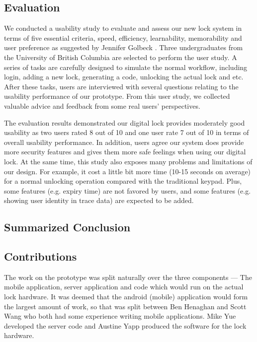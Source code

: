 \documentclass[conference]{IEEEtran}
\begin{document}
\subsection{Evaluation}
We conducted a usability study to evaluate and assess our new lock system in terms of five essential criteria, speed, efficiency, learnability, memorability and user preference as suggested by Jennifer Golbeck \cite{JG}. Three undergraduates from the University of British Columbia are selected to perform the user study. A series of tasks are carefully designed to simulate the normal workflow, including login, adding a new lock, generating a code, unlocking the actual lock and etc. After these tasks, users are interviewed with several questions relating to the usability performance of our prototype. From this user study, we collected valuable advice and feedback from some real users’ perspectives.

The evaluation results demonstrated our digital lock provides moderately good usability as two users rated 8 out of 10 and one user rate 7 out of 10 in terms of overall usability performance. In addition, users agree our system does provide more security features and gives them more safe feelings when using our digital lock. At the same time, this study also exposes many problems and limitations of our design. For example, it cost a little bit more time (10-15 seconds on average) for a normal unlocking operation compared with the traditional keypad. Plus, some features (e.g. expiry time) are not favored by users, and some features (e.g. showing user identity in trace data) are expected to be added.

\subsection{Summarized Conclusion}

\subsection{Contributions}
The work on the prototype was split naturally over the three components --- The mobile application, server application and code which would run on the actual lock hardware.
It was deemed that the android (mobile) application would form the largest amount of work, so that was split between Ben Henaghan and Scott Wang who both had some experience writing mobile applications.
Mike Yue developed the server code and Austine Yapp produced the software for the lock hardware.
\end{document}
